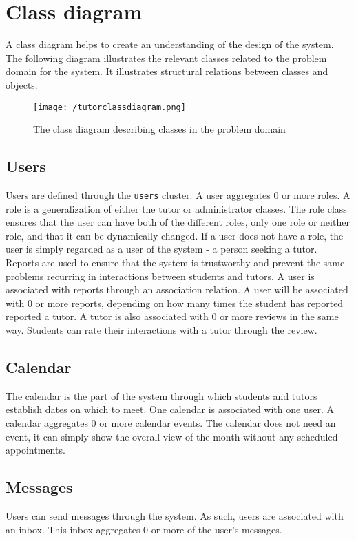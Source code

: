 \section{Class diagram}
A class diagram helps to create an understanding of the design of the system.
The following diagram illustrates the relevant classes related to the problem domain for the system.
It illustrates structural relations between classes and objects\cite{OOAD}.

\begin{figure}[H]
    \texttt{[image: /tutorclassdiagram.png]}
     \caption{The class diagram describing classes in the problem domain}
     \label{fig:class-diagram}
 \end{figure}

\subsection{Users}
Users are defined through the \texttt{users} cluster.
A user aggregates 0 or more roles.
A role is a generalization of either the tutor or administrator classes.
The role class ensures that the user can have both of the different roles, only one role or neither role, and that it can be dynamically changed.
If a user does not have a role, the user is simply regarded as a user of the system - a person seeking a tutor.
Reports are used to ensure that the system is trustworthy and prevent the same problems recurring in interactions between students and tutors.
A user is associated with reports through an association relation.
A user will be associated with 0 or more reports, depending on how many times the student has reported reported a tutor.
A tutor is also associated with 0 or more reviews in the same way.
Students can rate their interactions with a tutor through the review.

\subsection{Calendar}
The calendar is the part of the system through which students and tutors establish dates on which to meet.
One calendar is associated with one user.
A calendar aggregates 0 or more calendar events.
The calendar does not need an event, it can simply show the overall view of the month without any scheduled appointments.

\subsection{Messages}
Users can send messages through the system.
As such, users are associated with an inbox.
This inbox aggregates 0 or more of the user's messages.


